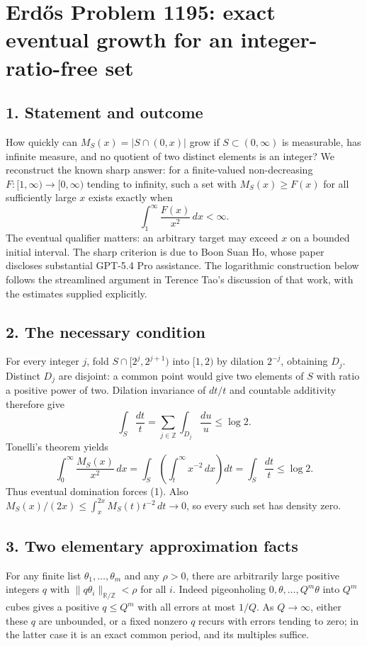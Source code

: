 \section*{Erd\H{o}s Problem 1195: exact eventual growth for an integer-ratio-free set}
\subsection*{1. Statement and outcome}
How quickly can $M_S(x)=|S\cap(0,x)|$ grow if $S\subset(0,\infty)$ is measurable, has infinite measure, and no quotient of two distinct elements is an integer? We reconstruct the known sharp answer: for a finite-valued non-decreasing $F:[1,\infty)\to[0,\infty)$ tending to infinity, such a set with $M_S(x)\ge F(x)$ for all sufficiently large $x$ exists exactly when
\[
 \int_1^\infty\frac{F(x)}{x^2}\,dx<\infty. \tag{1}
\]
The eventual qualifier matters: an arbitrary target may exceed $x$ on a bounded initial interval. The sharp criterion is due to Boon Suan Ho, whose paper discloses substantial GPT-5.4 Pro assistance. The logarithmic construction below follows the streamlined argument in Terence Tao's discussion of that work, with the estimates supplied explicitly.

\subsection*{2. The necessary condition}
For every integer $j$, fold $S\cap[2^j,2^{j+1})$ into $[1,2)$ by dilation $2^{-j}$, obtaining $D_j$. Distinct $D_j$ are disjoint: a common point would give two elements of $S$ with ratio a positive power of two. Dilation invariance of $dt/t$ and countable additivity therefore give
\[
 \int_S\frac{dt}{t}=\sum_{j\in\mathbb Z}\int_{D_j}\frac{du}{u}\le\log2.
\]
Tonelli's theorem yields
\[
 \int_0^\infty\frac{M_S(x)}{x^2}\,dx
 =\int_S\left(\int_t^\infty x^{-2}\,dx\right)dt
 =\int_S\frac{dt}{t}\le\log2. \tag{2}
\]
Thus eventual domination forces (1). Also $M_S(x)/(2x)\le\int_x^{2x}M_S(t)t^{-2}\,dt\to0$, so every such set has density zero.

\subsection*{3. Two elementary approximation facts}
For any finite list $\theta_1,\ldots,\theta_m$ and any $\rho>0$, there are arbitrarily large positive integers $q$ with $\|q\theta_i\|_{\mathbb R/\mathbb Z}<\rho$ for all $i$. Indeed pigeonholing $0,\theta,\ldots,Q^m\theta$ into $Q^m$ cubes gives a positive $q\le Q^m$ with all errors at most $1/Q$. As $Q\to\infty$, either these $q$ are unbounded, or a fixed nonzero $q$ recurs with errors tending to zero; in the latter case it is an exact common period, and its multiples suffice.

